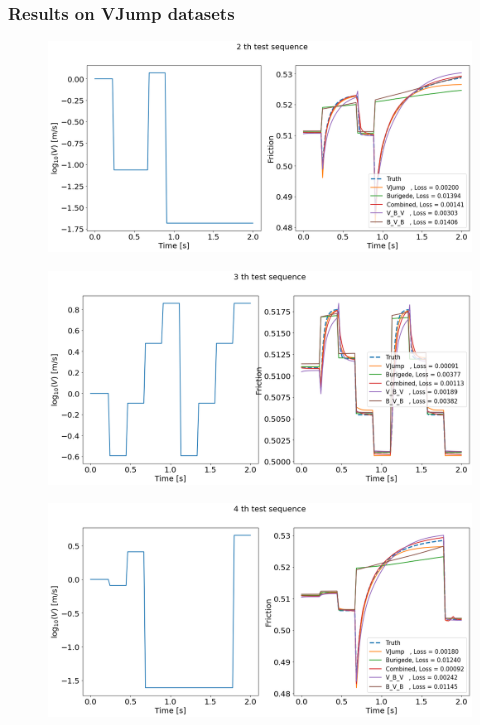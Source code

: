 \subsubsection{Results on VJump datasets} 
\begin{figure}[H]
    \centering
    \includegraphics[width=1.0\textwidth]{./images/Trial0112_VJump2.png}
\end{figure}
\begin{figure}[H]
    \centering
    \includegraphics[width=1.0\textwidth]{./images/Trial0112_VJump3.png}
\end{figure}
\begin{figure}[H]
    \centering
    \includegraphics[width=1.0\textwidth]{./images/Trial0112_VJump4.png}
\end{figure}
